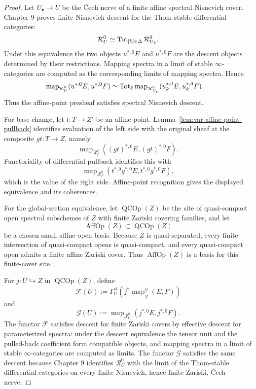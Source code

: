 \begin{proof}
Let \(U_\bullet\to U\) be the Čech nerve of a finite affine spectral Nisnevich cover. Chapter 9 proves finite Nisnevich descent for the Thom-stable differential categories:
\[
    \mathcal R_U^0
    \simeq
    \operatorname{Tot}_{[k]\in\Delta}\mathcal R_{U_k}^0.
\]
Under this equivalence the two objects \(u^{*,0}E\) and \(u^{*,0}F\) are the descent objects determined by their restrictions. Mapping spectra in a limit of stable \(\infty\)-categories are computed as the corresponding limits of mapping spectra. Hence
\[
\begin{aligned}
    \operatorname{map}_{\mathcal R_U^0}
    (u^{*,0}E,u^{*,0}F)
    &\simeq
    \operatorname{Tot}_k
    \operatorname{map}_{\mathcal R_{U_k}^0}
    (u_k^{*,0}E,u_k^{*,0}F).
\end{aligned}
\]
Thus the affine-point presheaf satisfies spectral Nisnevich descent.

For base change, let \(t:T\to Z'\) be an affine point. Lemma~\ref{lem:var-affine-point-pullback} identifies evaluation of the left side with the original sheaf at the composite \(gt:T\to Z\), namely
\[
    \operatorname{map}_{\mathcal R_T^0}
    ((gt)^{*,0}E,(gt)^{*,0}F).
\]
Functoriality of differential pullback identifies this with
\[
    \operatorname{map}_{\mathcal R_T^0}
    (t^{*,0}g^{*,0}E,t^{*,0}g^{*,0}F),
\]
which is the value of the right side. Affine-point recognition gives the displayed equivalence and its coherences.

For the global-section equivalence, let \(\operatorname{QCOp}(Z)\) be the site of quasi-compact open spectral subschemes of \(Z\) with finite Zariski covering families, and let
\[
    \operatorname{AffOp}(Z)
    \subset
    \operatorname{QCOp}(Z)
\]
be a chosen small affine-open basis. Because \(Z\) is quasi-separated, every finite intersection of quasi-compact opens is quasi-compact, and every quasi-compact open admits a finite affine Zariski cover. Thus \(\operatorname{AffOp}(Z)\) is a basis for this finite-cover site.

For \(j:U\hookrightarrow Z\) in \(\operatorname{QCOp}(Z)\), define
\[
    \mathcal F(U)
    :=
    \Gamma_U^{\mathrm{st}}
    \left(
      j^*\underline{\operatorname{map}}^{\partial}_{Z}(E,F)
    \right)
\]
and
\[
    \mathcal G(U)
    :=
    \operatorname{map}_{\mathcal R_U^0}
    (j^{*,0}E,j^{*,0}F).
\]
The functor \(\mathcal F\) satisfies descent for finite Zariski covers by effective descent for parameterized spectra: under the descent equivalence the tensor unit and the pulled-back coefficient form compatible objects, and mapping spectra in a limit of stable \(\infty\)-categories are computed as limits. The functor \(\mathcal G\) satisfies the same descent because Chapter 9 identifies \(\mathcal R_U^0\) with the limit of the Thom-stable differential categories on every finite Nisnevich, hence finite Zariski, Čech nerve.


\end{proof}
